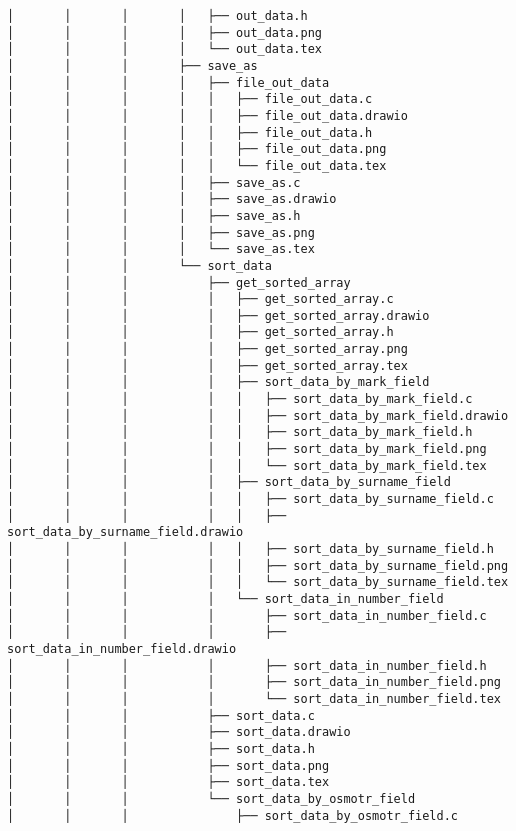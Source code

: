 \begin{verbatim}
│       │       │       │   ├── out_data.h
│       │       │       │   ├── out_data.png
│       │       │       │   └── out_data.tex
│       │       │       ├── save_as
│       │       │       │   ├── file_out_data
│       │       │       │   │   ├── file_out_data.c
│       │       │       │   │   ├── file_out_data.drawio
│       │       │       │   │   ├── file_out_data.h
│       │       │       │   │   ├── file_out_data.png
│       │       │       │   │   └── file_out_data.tex
│       │       │       │   ├── save_as.c
│       │       │       │   ├── save_as.drawio
│       │       │       │   ├── save_as.h
│       │       │       │   ├── save_as.png
│       │       │       │   └── save_as.tex
│       │       │       └── sort_data
│       │       │           ├── get_sorted_array
│       │       │           │   ├── get_sorted_array.c
│       │       │           │   ├── get_sorted_array.drawio
│       │       │           │   ├── get_sorted_array.h
│       │       │           │   ├── get_sorted_array.png
│       │       │           │   ├── get_sorted_array.tex
│       │       │           │   ├── sort_data_by_mark_field
│       │       │           │   │   ├── sort_data_by_mark_field.c
│       │       │           │   │   ├── sort_data_by_mark_field.drawio
│       │       │           │   │   ├── sort_data_by_mark_field.h
│       │       │           │   │   ├── sort_data_by_mark_field.png
│       │       │           │   │   └── sort_data_by_mark_field.tex
│       │       │           │   ├── sort_data_by_surname_field
│       │       │           │   │   ├── sort_data_by_surname_field.c
│       │       │           │   │   ├── sort_data_by_surname_field.drawio
│       │       │           │   │   ├── sort_data_by_surname_field.h
│       │       │           │   │   ├── sort_data_by_surname_field.png
│       │       │           │   │   └── sort_data_by_surname_field.tex
│       │       │           │   └── sort_data_in_number_field
│       │       │           │       ├── sort_data_in_number_field.c
│       │       │           │       ├── sort_data_in_number_field.drawio
│       │       │           │       ├── sort_data_in_number_field.h
│       │       │           │       ├── sort_data_in_number_field.png
│       │       │           │       └── sort_data_in_number_field.tex
│       │       │           ├── sort_data.c
│       │       │           ├── sort_data.drawio
│       │       │           ├── sort_data.h
│       │       │           ├── sort_data.png
│       │       │           ├── sort_data.tex
│       │       │           └── sort_data_by_osmotr_field
│       │       │               ├── sort_data_by_osmotr_field.c

\end{verbatim}
